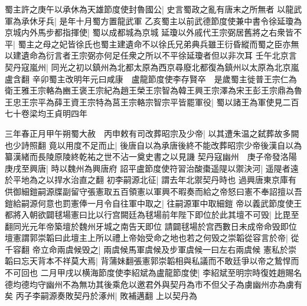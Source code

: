 蜀主許之庚午以承休為天雄節度使封魯國公|{
	史言蜀政之亂有唐末之所無者}
以龍武軍為承休牙兵|{
	是年十月蜀方置龍武軍}
乙亥蜀主以前武德節度使兼中書令徐延瓊為京城内外馬步都指揮使|{
	蜀以成都城為京城}
延瓊以外戚代王宗弼居舊將之右衆皆不平|{
	蜀主之母之妃皆徐氏也蜀主建遺命不以徐氏兄弟典兵雖王衍昏縱而蜀之臣亦無以建遺命為衍言者王宗弼亦何足任衆之所以不平徐延瓊者但以非次耳}
壬午北京言契丹寇嵐州|{
	同光之初以鎮州為北都太原為西京尋廢北都復為鎮州以太原為北京嵐盧含翻}
辛卯蜀主改明年元曰咸康　盧龍節度使李存賢卒　是歲蜀主徙普王宗仁為衛王雅王宗輅為豳王褒王宗紀為趙王榮王宗智為韓王興王宗澤為宋王彭王宗鼎為魯王忠王宗平為薛王資王宗特為莒王宗輅宗智宗平皆罷軍役|{
	蜀以諸王為軍使見二百七十卷梁均王貞明四年}


三年春正月甲午朔蜀大赦　丙申敕有司改葬昭宗及少帝|{
	以其遭朱温之弑葬故多闕也少詩照翻}
竟以用度不足而止|{
	後唐自以為承唐後終不能改葬昭宗少帝後漢自以為纂漢緒而長陵原陵終乾祐之世不沾一奠史書之以見譏}
契丹寇幽州　庚子帝發洛陽庚戌至興唐|{
	時以魏州為興唐府}
詔平盧節度使符習治酸棗遥隄以禦決河|{
	遥隄者遠於平地為之以捍水治直之翻}
初李嗣源北征|{
	謂去年北禦契丹時也}
過興唐東京庫有供御細鎧嗣源牒副留守張憲取五百領憲以軍興不暇奏而給之帝怒曰憲不奉詔擅以吾鎧給嗣源何意也罰憲俸一月令自往軍中取之|{
	往嗣源軍中取細鎧}
帝以義武節度使王都將入朝欲闢毬場憲曰比以行宫闕廷為毬場前年陛下即位於此其壇不可毁|{
	比毘至翻同光元年帝築壇於魏州牙城之南告天即位}
請闢毬場於宫西數日未成帝命毁即位壇憲謂郭崇韜曰此壇主上所以禮上帝始受命之地也若之何毁之崇韜從容言於帝|{
	從千容翻}
帝立命兩虞候毁之|{
	兩虞候馬軍虞候及步軍虞候一曰左右兩虞候}
憲私於崇韜曰忘天背本不祥莫大焉|{
	背蒲妹翻張憲郭崇韜相與私議而不敢廷爭以帝之鷙悍而不可回也}
二月甲戌以横海節度使李紹斌為盧龍節度使|{
	李紹斌至明宗時復姓趙賜名德均德均守幽州不為無功其後乘危以邀君外與契丹為市不但父子為虜幽州亦為虜有矣}
丙子李嗣源奏敗契丹於涿州|{
	敗補邁翻}
上以契丹為

